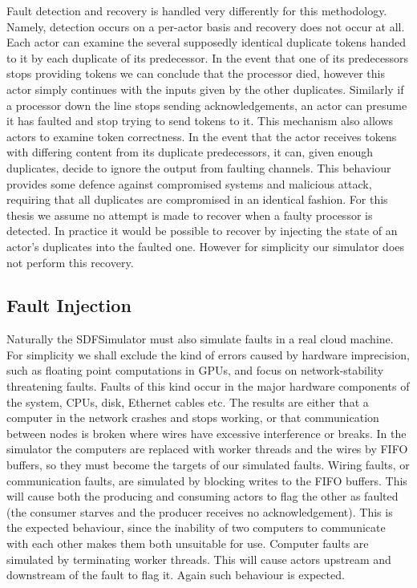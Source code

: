 Fault detection and recovery is handled very differently for this methodology.
Namely, detection occurs on a per-actor basis and recovery does not occur at all.
Each actor can examine the several supposedly identical duplicate tokens handed to it by each duplicate of its predecessor.
In the event that one of its predecessors stops providing tokens we can conclude that the processor died, however this actor simply continues with the inputs given by the other duplicates.
Similarly if a processor down the line stops sending acknowledgements, an actor can presume it has faulted and stop trying to send tokens to it.
This mechanism also allows actors to examine token correctness.
In the event that the actor receives tokens with differing content from its duplicate predecessors, it can, given enough duplicates, decide to ignore the output from faulting channels.
This behaviour provides some defence against compromised systems and malicious attack, requiring that all duplicates are compromised in an identical fashion.
For this thesis we assume no attempt is made to recover when a faulty processor is detected.
In practice it would be possible to recover by injecting the state of an actor's duplicates into the faulted one.
However for simplicity our simulator does not perform this recovery.

\subsection{Fault Injection}

Naturally the SDFSimulator must also simulate faults in a real cloud machine.
For simplicity we shall exclude the kind of errors caused by hardware imprecision, such as floating point computations in GPUs, and focus on network-stability threatening faults.
Faults of this kind occur in the major hardware components of the system, CPUs, disk, Ethernet cables etc.
The results are either that a computer in the network crashes and stops working, or that communication between nodes is broken where wires have excessive interference or breaks.
In the simulator the computers are replaced with worker threads and the wires by FIFO buffers, so they must become the targets of our simulated faults.
Wiring faults, or communication faults, are simulated by blocking writes to the FIFO buffers.
This will cause both the producing and consuming actors to flag the other as faulted (the consumer starves and the producer receives no acknowledgement).
This is the expected behaviour, since the inability of two computers to communicate with each other makes them both unsuitable for use.
Computer faults are simulated by terminating worker threads.
This will cause actors upstream and downstream of the fault to flag it.
Again such behaviour is expected.

